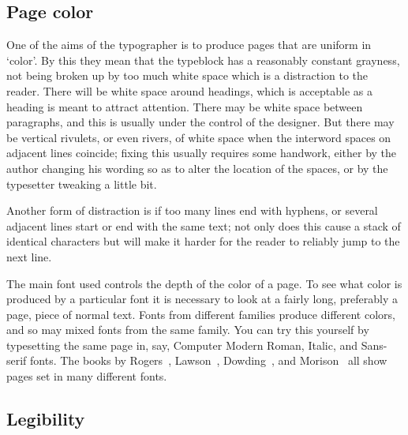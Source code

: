 \documentclass[10pt,a4paper,extrafontsizes]{memoir}
\begin{document}


\subsection{Page color}

\begin{paracol}{2}
\switchEng
    One of the aims of the typographer is to produce pages that are uniform
in `color'. By this they mean that the 
typeblock has a reasonably constant
grayness, not being broken up by too much white space which is a distraction
to the reader. There will be white space around headings, 
which is acceptable as a heading is meant to attract attention. 
There may be white space between paragraphs, and this is 
usually under the control of the designer. But there 
may be vertical rivulets, or even rivers, of white space when the 
interword spaces on adjacent lines coincide; fixing this usually 
requires some handwork, either
by the author changing his wording so as to alter the location of
the spaces, or by the typesetter tweaking a little bit. 

    Another form of distraction is if too many lines end with hyphens, or
several adjacent lines start or end with the same text; not only does
this cause a stack of identical characters but will make it harder for 
the reader to reliably jump to the next line.

    The main font used controls the depth of the color of a page. To
see what color is produced by a particular font it is necessary to look
at a fairly long, preferably a page, piece of normal text. Fonts from
different families produce different colors, and so may mixed fonts from 
the same family. You can try this yourself by typesetting the same page
in, say, Computer Modern Roman, Italic, and Sans-serif fonts.
The books by Rogers~\autocite{ROGERS43}, Lawson~\autocite{LAWSON90},
Dowding~\autocite{DOWDING98}, and 
Morison~\autocite{MORISON99} all show pages set in many different fonts.
\end{paracol}
    

\subsection{Legibility}
\end{document}
